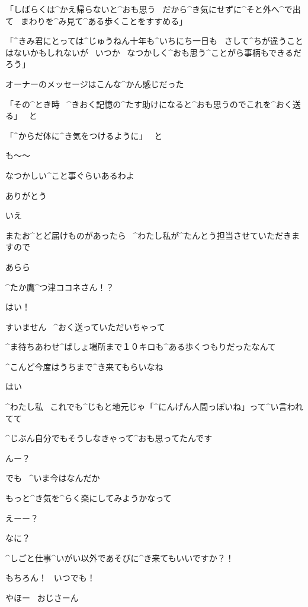 \page
\Hatsuseno 「しばらくは^{かえ}{帰}らないと^{おも}{思}う
\ だから^{き}{気}にせずに^{そと}{外}へ^{で}{出}て
\ まわりを^{み}{見}て^{ある}{歩}くことをすすめる」

\Hatsuseno 「^{きみ}{君}にとっては^{じゅうねん}{十年}も^{いちにち}{一日}も
\ さして^{ちが}{違}うことはないかもしれないが
\ いつか
\ なつかしく^{おも}{思}う^{ことがら}{事柄}もできるだろう」

\Alpha オーナーのメッセージはこんな^{かん}{感}じだった

\page
\Hatsuseno 「その^{とき}{時}
\ ^{きおく}{記憶}の^{たす}{助}けになると^{おも}{思}うのでこれを^{おく}{送}る」
\ と

\Hatsuseno 「^{からだ}{体}に^{き}{気}をつけるように」
\ と

\Alpha も〜〜

\Alpha なつかしい^{こと}{事}ぐらいあるわよ

\page
\Alpha ありがとう

\Kokone いえ

\Kokone またお^{とど}{届}けものがあったら
\ ^{わたし}{私}が^{たんとう}{担当}させていただきますので

\Alpha あらら

\Alpha ^{たか}{鷹}^{つ}{津}ココネさん！？

\Kokone はい！

\page
\Kokone すいません
\ ^{おく}{送}っていただいちゃって

\Alpha ^{ま}{待}ちあわせ^{ばしょ}{場所}まで１０キロも^{ある}{歩}くつもりだったなんて

\Alpha ^{こんど}{今度}はうちまで^{き}{来}てもらいなね

\Kokone はい

\page
\Kokone ^{わたし}{私}
\ これでも^{じもと}{地元}じゃ「^{にんげん}{人間}っぽいね」って^{い}{言}われてて

\Kokone ^{じぶん}{自分}でもそうしなきゃって^{おも}{思}ってたんです

\Alpha んー？

\Kokone でも
\ ^{いま}{今}はなんだか

\Kokone もっと^{き}{気}を^{らく}{楽}にしてみようかなって

\Alpha えーー？

\Alpha なに？

\page
\Kokone ^{しごと}{仕事}^{いがい}{以外}であそびに^{き}{来}てもいいですか？！

\Alpha もちろん！
\ いつでも！

\Alpha やほー
\ おじさーん

